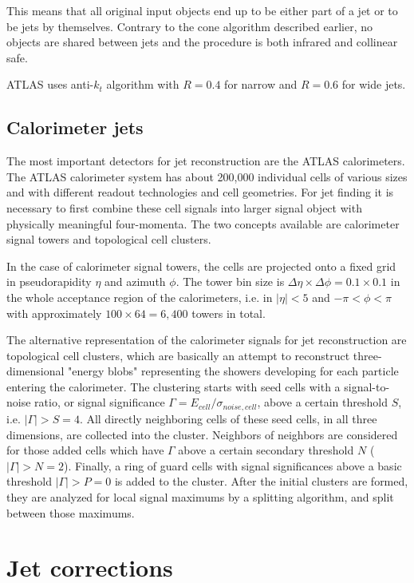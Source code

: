 This means that all original input objects end up to be either part of a jet or
to be jets by themselves. Contrary to the cone algorithm described earlier, no
objects are shared between jets and the procedure is both infrared and collinear
safe.

ATLAS uses anti-$k_t$ algorithm with $R=0.4$ for narrow and $R=0.6$ for wide
jets.

\subsection{Calorimeter jets}
\label{sse:CalorimeterJets}

The most important detectors for jet reconstruction are the ATLAS calorimeters.
The ATLAS calorimeter system has about 200,000 individual cells of various sizes
and with different readout technologies and cell geometries. For jet finding it
is necessary to first combine these cell signals into larger signal object with
physically meaningful four-momenta. The two concepts available are calorimeter
signal towers and topological cell clusters.

In the case of calorimeter signal towers, the cells are projected onto a fixed
grid in pseudorapidity $\eta$ and azimuth $\phi$. The tower bin size is $\Delta
\eta \times \Delta \phi = 0.1 \times 0.1$ in the whole acceptance region of the
calorimeters, i.e. in $|\eta| < 5$ and $- \pi < \phi < \pi$ with approximately 
$100 \times 64 = 6,400$ towers in total.

The alternative representation of the calorimeter signals for jet
reconstruction are topological cell clusters, which are basically an attempt to
reconstruct three-dimensional "energy blobs" representing the showers developing
for each particle entering the calorimeter. The clustering starts with seed
cells with a signal-to-noise ratio, or signal significance $\Gamma = E_{cell} /
\sigma_{noise,cell}$, above a certain threshold $S$, i.e. $|\Gamma| > S = 4$.
All directly neighboring cells of these seed cells, in all three dimensions,
are collected into the cluster. Neighbors of neighbors are considered for
those added cells which have $\Gamma$ above a certain secondary threshold $N$
($|\Gamma| > N = 2$). Finally, a ring of guard cells with signal significances
above a basic threshold $|\Gamma| > P = 0$ is added to the cluster. After the
initial clusters are formed, they are analyzed for local signal maximums by a
splitting algorithm, and split between those maximums.

\section{Jet corrections}

